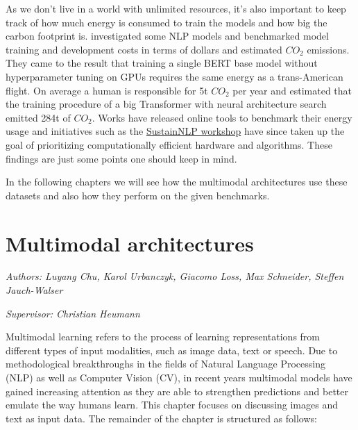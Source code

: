 \documentclass[
]{krantz}
\begin{document}
As we don't live in a world with unlimited resources, it's also important to keep track of how much energy is consumed to train the models and how big the carbon footprint is. \citet{strubell2019energy} investigated some NLP models and benchmarked model training and development costs in terms of dollars and estimated \(CO_2\) emissions. They came to the result that training a single BERT base model without hyperparameter tuning on GPUs requires the same energy as a trans-American flight. On average a human is responsible for 5t \(CO_2\) per year and \citet{strubell2019energy} estimated that the training procedure of a big Transformer with neural architecture search emitted 284t of \(CO_2\). Works \citep[\citet{henderson2020towards}]{lottick2019energy} have released online tools to benchmark their energy usage and initiatives such as the \href{https://sites.google.com/view/sustainlp2020/organization}{SustainNLP workshop} have since taken up the goal of prioritizing computationally efficient hardware and algorithms. These findings are just some points one should keep in mind.

In the following chapters we will see how the multimodal architectures use these datasets and also how they perform on the given benchmarks.

\hypertarget{multimodal-architectures}{%
\chapter{Multimodal architectures}\label{multimodal-architectures}}

\emph{Authors: Luyang Chu, Karol Urbanczyk, Giacomo Loss, Max Schneider, Steffen Jauch-Walser}

\emph{Supervisor: Christian Heumann}

Multimodal learning refers to the process of learning representations from different types of input modalities, such as image data, text or speech.
Due to methodological breakthroughs in the fields of Natural Language Processing (NLP) as well as Computer Vision (CV), in recent years multimodal models have gained increasing attention as they are able to strengthen predictions and better emulate the way humans learn.
This chapter focuses on discussing images and text as input data.
The remainder of the chapter is structured as follows:
\end{document}

